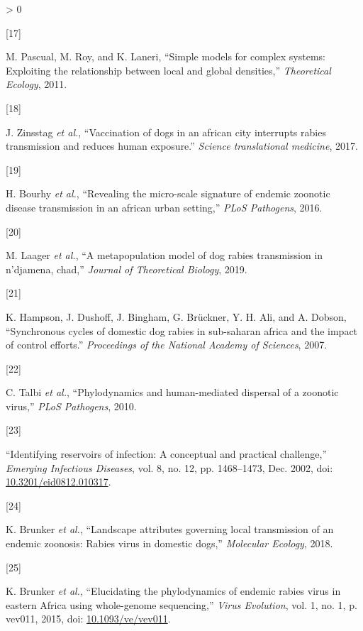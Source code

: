 \documentclass[
]{book}
\newlength{\cslhangindent}
\newlength{\csllabelwidth}
\newenvironment{CSLReferences}[2] %
 {%
  \setlength{\parindent}{0pt}
  \ifodd #1 \everypar{\setlength{\hangindent}{\cslhangindent}}\ignorespaces\fi
  \ifnum #2 > 0
  \setlength{\parskip}{#2\baselineskip}
  \fi
 }%
 {}
\newcommand{\CSLLeftMargin}[1]{\parbox[t]{\csllabelwidth}{#1}}
\newcommand{\CSLRightInline}[1]{\parbox[t]{\linewidth - \csllabelwidth}{#1}\break}
\begin{document}
\begin{CSLReferences}{0}{0}
\leavevmode\hypertarget{ref-pascual2011}{}%
\CSLLeftMargin{{[}17{]} }
\CSLRightInline{M. Pascual, M. Roy, and K. Laneri, {``Simple models for complex systems: Exploiting the relationship between local and global densities,''} \emph{Theoretical Ecology}, 2011.}

\leavevmode\hypertarget{ref-zinsstag2017}{}%
\CSLLeftMargin{{[}18{]} }
\CSLRightInline{J. Zinsstag \emph{et al.}, {``Vaccination of dogs in an african city interrupts rabies transmission and reduces human exposure.''} \emph{Science translational medicine}, 2017.}

\leavevmode\hypertarget{ref-bourhy2016}{}%
\CSLLeftMargin{{[}19{]} }
\CSLRightInline{H. Bourhy \emph{et al.}, {``Revealing the micro-scale signature of endemic zoonotic disease transmission in an african urban setting,''} \emph{PLoS Pathogens}, 2016.}

\leavevmode\hypertarget{ref-laager2019}{}%
\CSLLeftMargin{{[}20{]} }
\CSLRightInline{M. Laager \emph{et al.}, {``A metapopulation model of dog rabies transmission in n'djamena, chad,''} \emph{Journal of Theoretical Biology}, 2019.}

\leavevmode\hypertarget{ref-hampson2007}{}%
\CSLLeftMargin{{[}21{]} }
\CSLRightInline{K. Hampson, J. Dushoff, J. Bingham, G. Brückner, Y. H. Ali, and A. Dobson, {``Synchronous cycles of domestic dog rabies in sub-saharan africa and the impact of control efforts.''} \emph{Proceedings of the National Academy of Sciences}, 2007.}

\leavevmode\hypertarget{ref-talbi2010}{}%
\CSLLeftMargin{{[}22{]} }
\CSLRightInline{C. Talbi \emph{et al.}, {``Phylodynamics and human-mediated dispersal of a zoonotic virus,''} \emph{PLoS Pathogens}, 2010.}

\leavevmode\hypertarget{ref-identify2002}{}%
\CSLLeftMargin{{[}23{]} }
\CSLRightInline{{``Identifying reservoirs of infection: A conceptual and practical challenge,''} \emph{Emerging Infectious Diseases}, vol. 8, no. 12, pp. 1468--1473, Dec. 2002, doi: \href{https://doi.org/10.3201/eid0812.010317}{10.3201/eid0812.010317}.}

\leavevmode\hypertarget{ref-brunker2018}{}%
\CSLLeftMargin{{[}24{]} }
\CSLRightInline{K. Brunker \emph{et al.}, {``Landscape attributes governing local transmission of an endemic zoonosis: Rabies virus in domestic dogs,''} \emph{Molecular Ecology}, 2018.}

\leavevmode\hypertarget{ref-Brunker2015}{}%
\CSLLeftMargin{{[}25{]} }
\CSLRightInline{K. Brunker \emph{et al.}, {``Elucidating the phylodynamics of endemic rabies virus in eastern Africa using whole-genome sequencing,''} \emph{Virus Evolution}, vol. 1, no. 1, p. vev011, 2015, doi: \href{https://doi.org/10.1093/ve/vev011}{10.1093/ve/vev011}.}

\end{CSLReferences}
\end{document}
